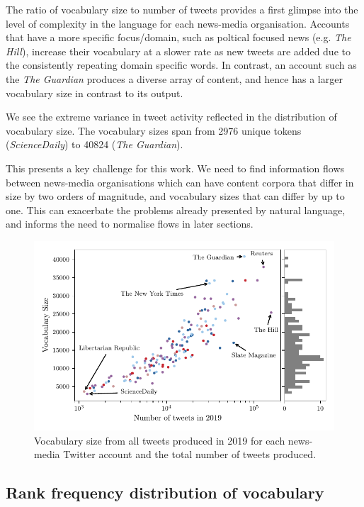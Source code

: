 The ratio of vocabulary size to number of tweets provides a first glimpse into the level of complexity in the language for each news-media organisation. Accounts that have a more specific focus/domain, such as poltical focused news (e.g. \emph{The Hill}), increase their vocabulary at a slower rate as new tweets are added due to the consistently repeating domain specific words. In contrast, an account such as the \emph{The Guardian} produces a diverse array of content, and hence has a larger vocabulary size in contrast to its output.

We see the extreme variance in tweet activity reflected in the distribution of vocabulary size. The vocabulary sizes span from 2976 unique tokens (\emph{ScienceDaily}) to 40824 (\emph{The Guardian}). 

This presents a key challenge for this work. We need to find information flows between news-media organisations which can have content corpora that differ in size by two orders of magnitude, and vocabulary sizes that can differ by up to one. This can exacerbate the problems already presented by natural language, and informs the need to normalise flows in later sections.


\begin{figure}[!htbp]
\centering
\includegraphics{chapter1/figs/vocab_vs_activity.pdf}
\caption{Vocabulary size from all tweets produced in 2019 for each news-media Twitter account and the total number of tweets produced.}\label{fig:data_vocabvsactivity}
\end{figure}

\subsection{Rank frequency distribution of vocabulary}\label{sec:zipf_fit}

